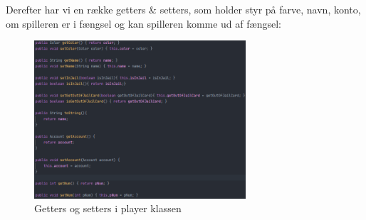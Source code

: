 Derefter har vi en række getters \& setters, som holder styr på farve, navn, konto, om spilleren er i fængsel og kan spilleren komme ud af fængsel:
\begin{figure}[H]
    \centering
    \includegraphics[width=0.7\textwidth]{sources/7_implementering/getSet.PNG}
    \caption{Getters og setters i player klassen}
    \label{fig:GetterSetter}
\end{figure}
